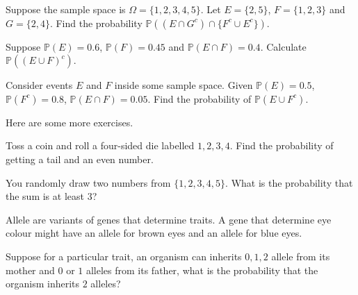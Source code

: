 \documentclass[../main.tex]{subfiles}
\begin{document}
\begin{example}
  Suppose the sample space is \(\Omega = \{1,2,3,4,5\}\).  Let \(E = \{2,5\}\), \(F = \{1,2,3\}\) and \(G = \{2,4\}\). Find the probability \(\mathbb{P}( (E \cap G^{c}) \cap \{ F^{c} \cup E^{c} \}) \).
\end{example}

\begin{example}
  Suppose \(\mathbb{P}(E) = 0.6\), \(\mathbb{P}(F) = 0.45\) and \(\mathbb{P}(E \cap F) = 0.4\). Calculate \(\mathbb{P}( (E \cup F)^{c})\).
\end{example}

\begin{example}
  Consider events \(E\) and \(F\) inside some sample space. Given \(\mathbb{P}(E) = 0.5\), \(\mathbb{P}(F^{c}) = 0.8\), \(\mathbb{P}(E \cap F) = 0.05\). Find the probability of \(\mathbb{P}(E \cup F^{c})\).
\end{example}
\clearpage

Here are some more exercises.
\begin{example}
  Toss a coin and roll a four-sided die labelled \(1,2,3,4\).  Find the probability of getting a tail and an even number.

\end{example}

\begin{example}
  You randomly draw two numbers from \(\{1,2,3,4,5\}\). What is the probability that the sum is at least \(3\)?

\end{example}

\begin{example}
  Allele are variants of genes that determine traits.  A gene that determine eye colour might have an allele for brown eyes and an allele for blue eyes.  

  Suppose for a particular trait, an organism can inherits \(0,1,2\) allele from its mother and \(0\) or \(1\) alleles from its father, what is the probability that the organism inherits \(2\) alleles?

\end{example}
\clearpage
\end{document}
